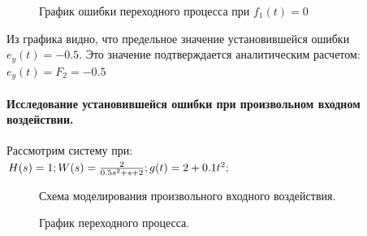 \documentclass[a4paper, 11pt]{article}
\begin{document}
\begin{figure}[h]
    \caption{График ошибки переходного процесса при $f_1(t) = 0$}
    \label{tree}
\end{figure}
\newpage
Из графика видно, что предельное значение установившейся ошибки $e_y(t)=-0.5$. Это значение подтверждается аналитическим расчетом:
$e_y(t)=F_2=-0.5$
\newpage
\paragraph{Исследование установившейся ошибки при произвольном входном воздействии.} Рассмотрим систему при:\\
$H(s)=1; \\\\ 
W(s)=\frac {2} {0.5s^2+s+2}; \\\\  
g(t)=2+0.1t^2;$

\begin{figure}[h!]
    \caption{Схема моделирования произвольного входного воздействия.}
    \label{two}
\end{figure}

\begin{figure}[h!]
    \caption{График переходного процесса.}
    \label{two}
\end{figure}
    
\end{document}
